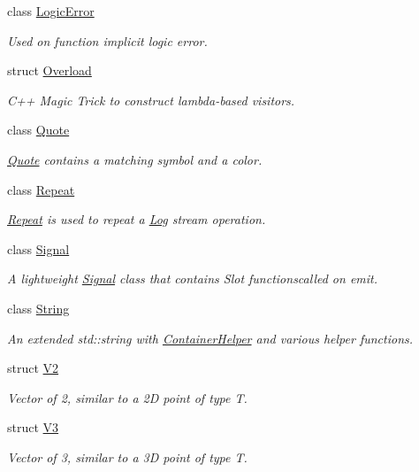 \begin{DoxyCompactItemize}
class \mbox{\hyperlink{classo_a_1_1_logic_error}{Logic\+Error}}
\begin{DoxyCompactList}\small\item\em Used on function implicit logic error. \end{DoxyCompactList}\item 
struct \mbox{\hyperlink{structo_a_1_1_overload}{Overload}}
\begin{DoxyCompactList}\small\item\em C++ Magic Trick to construct lambda-\/based visitors. \end{DoxyCompactList}\item 
class \mbox{\hyperlink{classo_a_1_1_quote}{Quote}}
\begin{DoxyCompactList}\small\item\em \mbox{\hyperlink{classo_a_1_1_quote}{Quote}} contains a matching symbol and a color. \end{DoxyCompactList}\item 
class \mbox{\hyperlink{classo_a_1_1_repeat}{Repeat}}
\begin{DoxyCompactList}\small\item\em \mbox{\hyperlink{classo_a_1_1_repeat}{Repeat}} is used to repeat a \mbox{\hyperlink{classo_a_1_1_log}{Log}} stream operation. \end{DoxyCompactList}\item 
class \mbox{\hyperlink{classo_a_1_1_signal}{Signal}}
\begin{DoxyCompactList}\small\item\em A lightweight \mbox{\hyperlink{classo_a_1_1_signal}{Signal}} class that contains Slot functionscalled on emit. \end{DoxyCompactList}\item 
class \mbox{\hyperlink{classo_a_1_1_string}{String}}
\begin{DoxyCompactList}\small\item\em An extended std\+::string with \mbox{\hyperlink{classo_a_1_1_container_helper}{Container\+Helper}} and various helper functions. \end{DoxyCompactList}\item 
struct \mbox{\hyperlink{structo_a_1_1_v2}{V2}}
\begin{DoxyCompactList}\small\item\em Vector of 2, similar to a 2D point of type T. \end{DoxyCompactList}\item 
struct \mbox{\hyperlink{structo_a_1_1_v3}{V3}}
\begin{DoxyCompactList}\small\item\em Vector of 3, similar to a 3D point of type T. \end{DoxyCompactList}\end{DoxyCompactItemize}
